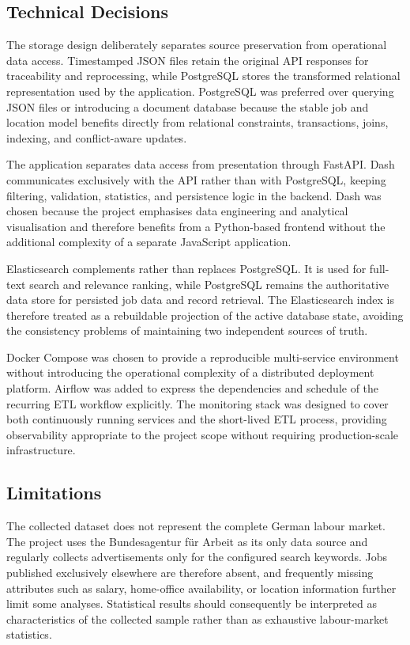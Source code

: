 \documentclass[11pt,a4paper]{article}
\begin{document}
\subsection{Technical Decisions}

The storage design deliberately separates source preservation from operational data access. Timestamped JSON files retain the original API responses for traceability and reprocessing, while PostgreSQL stores the transformed relational representation used by the application. PostgreSQL was preferred over querying JSON files or introducing a document database because the stable job and location model benefits directly from relational constraints, transactions, joins, indexing, and conflict-aware updates.

The application separates data access from presentation through FastAPI. Dash communicates exclusively with the API rather than with PostgreSQL, keeping filtering, validation, statistics, and persistence logic in the backend. Dash was chosen because the project emphasises data engineering and analytical visualisation and therefore benefits from a Python-based frontend without the additional complexity of a separate JavaScript application.

Elasticsearch complements rather than replaces PostgreSQL. It is used for full-text search and relevance ranking, while PostgreSQL remains the authoritative data store for persisted job data and record retrieval. The Elasticsearch index is therefore treated as a rebuildable projection of the active database state, avoiding the consistency problems of maintaining two independent sources of truth.

Docker Compose was chosen to provide a reproducible multi-service environment without introducing the operational complexity of a distributed deployment platform. Airflow was added to express the dependencies and schedule of the recurring ETL workflow explicitly. The monitoring stack was designed to cover both continuously running services and the short-lived ETL process, providing observability appropriate to the project scope without requiring production-scale infrastructure.


\subsection{Limitations}

The collected dataset does not represent the complete German labour market. The project uses the Bundesagentur für Arbeit as its only data source and regularly collects advertisements only for the configured search keywords. Jobs published exclusively elsewhere are therefore absent, and frequently missing attributes such as salary, home-office availability, or location information further limit some analyses. Statistical results should consequently be interpreted as characteristics of the collected sample rather than as exhaustive labour-market statistics.
\end{document}

